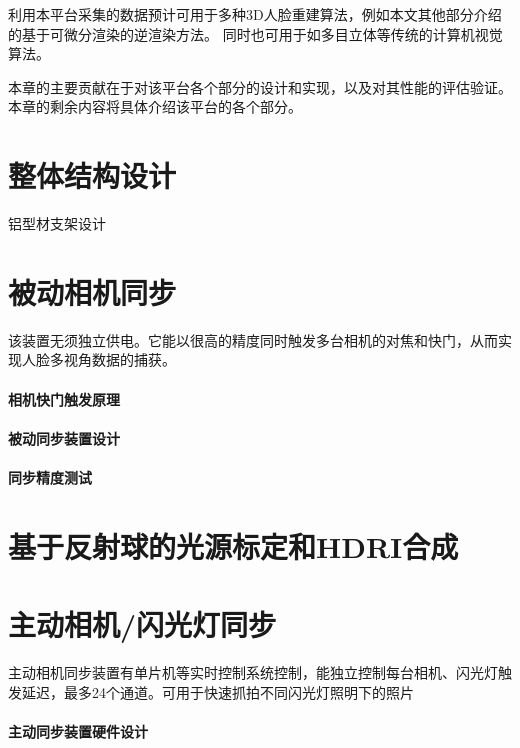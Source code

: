 利用本平台采集的数据预计可用于多种3D人脸重建算法，例如本文其他部分介绍的基于可微分渲染的逆渲染方法。
同时也可用于如多目立体等传统的计算机视觉算法。

本章的主要贡献在于对该平台各个部分的设计和实现，以及对其性能的评估验证。
本章的剩余内容将具体介绍该平台的各个部分。

\section{整体结构设计}

铝型材支架设计

\section{被动相机同步}
\label{sec:passive_sync}

该装置无须独立供电。它能以很高的精度同时触发多台相机的对焦和快门，从而实现人脸多视角数据的捕获。

\paragraph{相机快门触发原理}

\paragraph{被动同步装置设计}

\paragraph{同步精度测试}



\section{基于反射球的光源标定和HDRI合成}

\section{主动相机/闪光灯同步}

主动相机同步装置有单片机等实时控制系统控制，能独立控制每台相机、闪光灯触发延迟，最多24个通道。可用于快速抓拍不同闪光灯照明下的照片

\paragraph{主动同步装置硬件设计}

